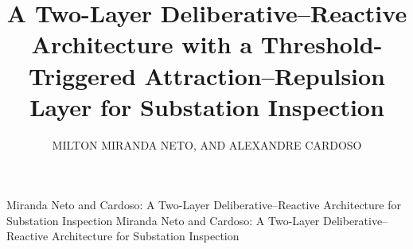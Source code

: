 \documentclass{ieeeaccess}
\begin{document}
\history{}
\doi{}

\title{A Two-Layer Deliberative--Reactive Architecture with a
Threshold-Triggered Attraction--Repulsion Layer for Substation Inspection}

\author{\uppercase{Milton Miranda Neto},
\uppercase{and Alexandre Cardoso}}
\address[1]{Faculty of Electrical Engineering, Universidade Federal de
Uberl\^andia (UFU), Uberl\^andia, MG 38400-902, Brazil
(e-mail: voidmmn@ufu.br; alexandre@ufu.br)}

\markboth
{Miranda Neto and Cardoso: A Two-Layer Deliberative--Reactive Architecture for Substation Inspection}
{Miranda Neto and Cardoso: A Two-Layer Deliberative--Reactive Architecture for Substation Inspection}
\end{document}
